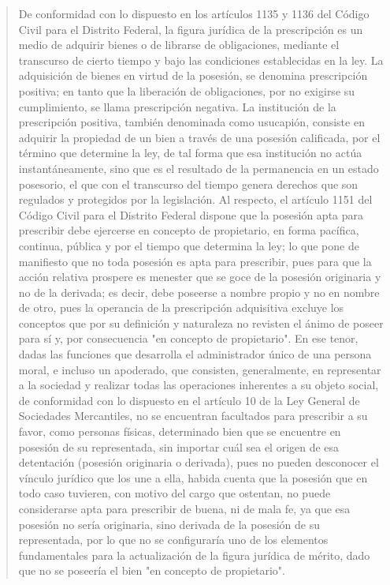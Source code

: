\documentclass[11pt,a4paper]{article}
\begin{document}
\begin{quote}
De conformidad con lo dispuesto en los artículos 1135 y 1136 del Código Civil para el Distrito
Federal, la figura jurídica de la prescripción es un medio de adquirir bienes o de librarse de
obligaciones, mediante el transcurso de cierto tiempo y bajo las condiciones establecidas en la ley.
La adquisición de bienes en virtud de la posesión, se denomina prescripción positiva; en tanto que
la liberación de obligaciones, por no exigirse su cumplimiento, se llama prescripción negativa. La
institución de la prescripción positiva, también denominada como usucapión, consiste en adquirir la
propiedad de un bien a través de una posesión calificada, por el término que determine la ley, de tal
forma que esa institución no actúa instantáneamente, sino que es el resultado de la permanencia en
un estado posesorio, el que con el transcurso del tiempo genera derechos que son regulados y
protegidos por la legislación. Al respecto, el artículo 1151 del Código Civil para el Distrito Federal
dispone que la posesión apta para prescribir debe ejercerse en concepto de propietario, en forma
pacífica, continua, pública y por el tiempo que determina la ley; lo que pone de manifiesto que no
toda posesión es apta para prescribir, pues para que la acción relativa prospere es menester que se
goce de la posesión originaria y no de la derivada; es decir, debe poseerse a nombre propio y no en
nombre de otro, pues la operancia de la prescripción adquisitiva excluye los conceptos que por su
definición y naturaleza no revisten el ánimo de poseer para sí y, por consecuencia "en concepto de
propietario". En ese tenor, dadas las funciones que desarrolla el administrador único de una
persona moral, e incluso un apoderado, que consisten, generalmente, en representar a la sociedad
y realizar todas las operaciones inherentes a su objeto social, de conformidad con lo dispuesto en el
artículo 10 de la Ley General de Sociedades Mercantiles, no se encuentran facultados para
prescribir a su favor, como personas físicas, determinado bien que se encuentre en posesión de su
representada, sin importar cuál sea el origen de esa detentación (posesión originaria o derivada),
pues no pueden desconocer el vínculo jurídico que los une a ella, habida cuenta que la posesión
que en todo caso tuvieren, con motivo del cargo que ostentan, no puede considerarse apta para
prescribir de buena, ni de mala fe, ya que esa posesión no sería originaria, sino derivada de la
posesión de su representada, por lo que no se configuraría uno de los elementos fundamentales
para la actualización de la figura jurídica de mérito, dado que no se poseería el bien "en concepto
de propietario".


\end{quote}
\end{document}
